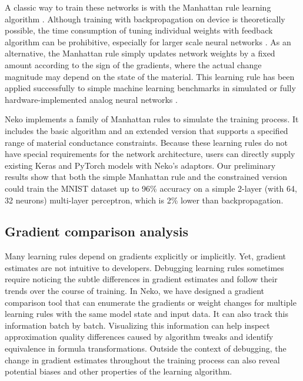 \documentclass[sigconf,dvipsnames]{acmart}
\begin{document}
A classic way to train these networks is with the Manhattan rule learning algorithm \cite{7139171}.
Although training with backpropagation on device is theoretically possible, the time consumption of tuning individual weights with feedback algorithm can be prohibitive, especially for larger scale neural networks \cite{Alibart_2012}.
As an alternative, the Manhattan rule simply updates network weights by a fixed amount according to the sign of the gradients, where the actual change magnitude may depend on the state of the material.
This learning rule has been applied successfully to simple machine learning  benchmarks in simulated or fully hardware-implemented analog neural networks \cite{yao2020fully}.

Neko implements a family of Manhattan rules to simulate the training process.
It includes the basic algorithm and an extended version that supports a specified range of material conductance constraints.
Because these learning rules do not have special requirements for the network architecture, users can directly supply existing Keras and PyTorch models with Neko's adaptors.
Our preliminary results show that both the simple Manhattan rule and the constrained version could train the MNIST dataset up to 96\% accuracy on a simple 2-layer (with 64, 32 neurons) multi-layer perceptron, which is 2\% lower than backpropagation.


\subsection{Gradient comparison analysis}
Many learning rules depend on gradients explicitly or implicitly.
Yet, gradient estimates are not intuitive to developers.
Debugging learning rules sometimes require noticing the subtle differences in gradient estimates and follow their trends over the course of training.
In Neko, we have designed a gradient comparison tool that can enumerate the gradients or weight changes for multiple learning rules with the same model state and input data.
It can also track this information batch by batch.
Visualizing this information can help inspect approximation quality differences caused by algorithm tweaks and identify equivalence in formula transformations.
Outside the context of debugging, the change in gradient estimates throughout the training process can also reveal potential biases and other properties of the learning algorithm.
\end{document}
